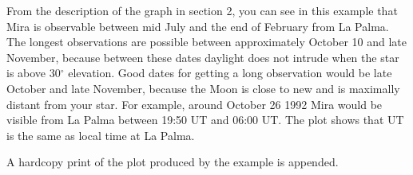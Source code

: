 From the description of the graph in section 2, you can see in this example 
that Mira is  observable between mid July and the end of February from La
Palma.  The longest observations  are possible between approximately October 10
and late November, because  between these dates daylight does not intrude when
the star is above 30$^{\circ}$ elevation. Good dates for getting a long
observation would be late October and late November, because the Moon is  close
to new and is maximally distant from your star. For example, around  October 26
1992 Mira would be visible from La Palma between 19:50 UT and 06:00 UT. The
plot shows that UT is the same as local time at La Palma.

A hardcopy print of the plot produced by the example is appended.



